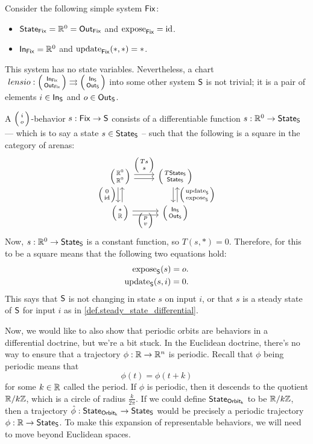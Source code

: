 \documentclass[DynamicalBook]{subfiles}
\begin{document}
\begin{example}
  Consider the following simple system $\mathsf{Fix}$:
  \begin{itemize}
\item $\mathsf{State}_{\mathsf{Fix}} = \mathbb{R}^0 = \mathsf{Out}_{\mathsf{Fix}}$ and $\mathrm{expose}_{\mathsf{Fix}} = \mathrm{id}$.
\item $\mathsf{In}_{\mathsf{Fix}} = \mathbb{R}^0$ and $\mathrm{update}_{\mathsf{Fix}}(\ast, \ast) = \ast$.
\end{itemize}
This system has no state variables. Nevertheless, a chart $\
lens{i}{o} : \lens{\In{Fix}}{\Out{Fix}} \rightrightarrows
\lens{\In{S}}{\Out{S}}$ into some other system $\mathsf{S}$ is not trivial; it is a
pair of elements $i \in \mathsf{In}_{\mathsf{S}}$ and $o \in \mathsf{Out}_{\mathsf{S}}$.

A $\lens{i}{o}$-behavior $s : \mathsf{Fix} \to \mathsf{S}$ consists of a
differentiable function $s : \mathbb{R}^0 \to \mathsf{State}_{\mathsf{S}}$ --- which is to say a state
$s \in \mathsf{State}_{\mathsf{S}}$ -- such that the following is a square in the category of
arenas:
\[
    \begin{tikzcd}
      \lens{\rr^0}{\rr^0} \ar[r, shift left, "\lens{Ts}{s}"] \ar[r, shift right] \ar[d, shift right,
      "\lens{0}{\id}"'] \ar[d, shift left, leftarrow] &
      \lens{T\State{S}}{\State{S}} \ar[d, shift left, leftarrow,
      "\lens{\update{S}}{\expose{S}}"] \ar[d, shift right]\\
      \lens{{\ast}}{\rr} \ar[r, shift right] \ar[r,
      shift left, "\lens{p}{v}"'] & \lens{\In{S}}{\Out{S}}
    \end{tikzcd}
\]
Now, $s : \mathbb{R}^0 \to \mathsf{State}_{\mathsf{S}}$ is a constant function, so $T(s, \ast) = 0$.
Therefore, for this to be a square means that the following two equations hold:
\begin{align*}
\mathrm{expose}_{\mathsf{S}}(s) = o. \\
\mathrm{update}_{\mathsf{S}}(s, i) = 0.
\end{align*}
This says that $\mathsf{S}$ is not changing in state $s$ on input $i$, or that $s$
is a steady state of $\mathsf{S}$ for input $i$ as in \cref{def.steady_state_differential}.
\end{example}

Now, we would like to also show that periodic orbits are behaviors in a
differential doctrine, but we're a bit stuck. In the Euclidean doctrine, there's
no way to ensure that a trajectory $\phi : \mathbb{R} \to \mathbb{R}^n$ is periodic. Recall
that $\phi$ being periodic means that 
$$\phi(t) = \phi(t + k)$$
for some $k \in \mathbb{R}$ called the period. If $\phi$ is periodic, then it descends
to the quotient $\mathbb{R} / k\mathbb{Z}$, which is a circle of radius $\frac{k}{2\pi}$. If
we could define $\mathsf{State}_{\mathsf{Orbit_k}}$ to be $\mathbb{R} / k\mathbb{Z}$, then a trajectory $\hat{\phi} :
\mathsf{State}_{\mathsf{Orbit_k}} \to \mathsf{State}_{\mathsf{S}}$ would be precisely a periodic trajectory $\phi :
\mathbb{R} \to \mathsf{State}_{\mathsf{S}}$. To make this expansion of representable behaviors, we will
need to move beyond Euclidean spaces.
\end{document}
